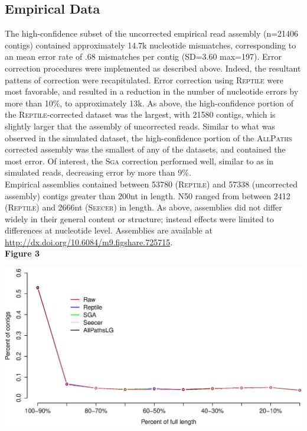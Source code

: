 \documentclass[11pt]{article}
\begin{document}
\subsection*{Empirical Data} 
The high-confidence subset of the uncorrected empirical read assembly (n=21406 contigs) contained approximately 14.7k nucleotide mismatches, corresponding to an mean error rate of .68 mismatches per contig (SD=3.60 max=197).  Error correction procedures were implemented as described above. Indeed, the resultant pattens of correction were recapitulated. Error correction using \textsc{Reptile} were most favorable, and resulted in a reduction in the number of nucleotide errors by more than 10\%, to approximately 13k.  As above, the high-confidence portion of the \textsc{Reptile}-corrected dataset was the largest, with 21580 contigs, which is slightly larger that the assembly of uncorrected reads. Similar to what was observed in the simulated dataset, the high-confidence portion of the \textsc{AllPaths} corrected assembly was the smallest of any of the datasets, and contained the most error. Of interest, the \textsc{Sga} correction performed well, similar to as in simulated reads, decreasing error by more than 9\%. \\

\noindent
Empirical assemblies contained between 53780 (\textsc{Reptile}) and 57338 (uncorrected assembly) contigs greater than 200nt in length.  N50 ranged from between 2412 (\textsc{Reptile}) and 2666nt (\textsc{Seecer}) in length.  As above, assemblies did not differ widely in their general content or structure; instead effects were limited to differences at nucleotide level. Assemblies are available at \url{http://dx.doi.org/10.6084/m9.figshare.725715}. \\

\textbf{\hypertarget{Figure 3}{Figure 3}} \\
\centerline{\includegraphics[width=20.0\baselineskip]{newFig4.eps}}
\end{document}
